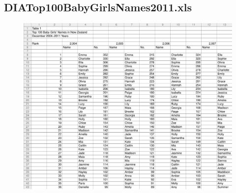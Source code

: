\documentclass[a4paper]{article}
\begin{document}
\newpage
\subsection{DIATop100BabyGirlsNames2011.xls}
\label{sec:TCRO_DIATop100BabyGirlsNames2011.xls}
\begin{figure}[!h]
\centering
\includegraphics[width=\textwidth]{./TestCase/DIATop100BabyGirlsNames2011.pdf}
\end{figure}
\end{document}
